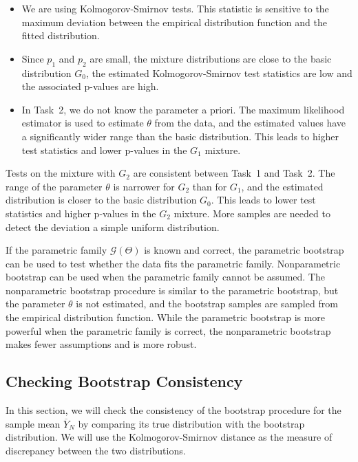 \documentclass{article}
\begin{document}
\begin{itemize}
    \item We are using Kolmogorov-Smirnov tests. This statistic is sensitive to the maximum deviation between the empirical distribution function and the fitted distribution.
    \item Since \(p_1\) and \(p_2\) are small, the mixture distributions are close to the basic distribution \(G_0\), the estimated Kolmogorov-Smirnov test statistics are low and the associated p-values are high.
    \item In Task~2, we do not know the parameter a priori. The maximum likelihood estimator is used to estimate \(\theta\) from the data, and the estimated values have a significantly wider range than the basic distribution. This leads to higher test statistics and lower p-values in the \(G_1\) mixture.
\end{itemize}

Tests on the mixture with \(G_2\) are consistent between Task~1 and Task~2. The range of the parameter \(\theta\) is narrower for \(G_2\) than for \(G_1\), and the estimated distribution is closer to the basic distribution \(G_0\). This leads to lower test statistics and higher p-values in the \(G_2\) mixture. More samples are needed to detect the deviation a simple uniform distribution.

If the parametric family \(\mathcal{G}(\Theta)\) is known and correct, the parametric bootstrap can be used to test whether the data fits the parametric family. Nonparametric bootstrap can be used when the parametric family cannot be assumed. The nonparametric bootstrap procedure is similar to the parametric bootstrap, but the parameter \(\theta\) is not estimated, and the bootstrap samples are sampled from the empirical distribution function. While the parametric bootstrap is more powerful when the parametric family is correct, the nonparametric bootstrap makes fewer assumptions and is more robust.

\subsection{Checking Bootstrap Consistency}

In this section, we will check the consistency of the bootstrap procedure for the sample mean \(\overline{Y}_N\) by comparing its true distribution with the bootstrap distribution. We will use the Kolmogorov-Smirnov distance as the measure of discrepancy between the two distributions.
\end{document}
